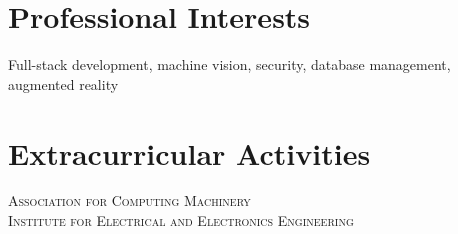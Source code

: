 \documentclass[a4paper,10pt]{article}
\begin{document}
\section{Professional Interests}
Full-stack development, machine vision, security, database management, augmented reality \\

\section{Extracurricular Activities}
\textsc{Association for Computing Machinery} \\ 
\textsc{Institute for Electrical and Electronics Engineering}
\end{document}
